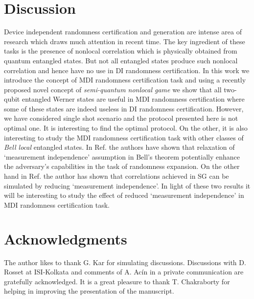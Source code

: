 \documentclass[doublecol,linenumbers]{epl2} %
\begin{document}
\section{Discussion}\label{sec5}

Device independent randomness certification and generation are intense area of research which draws much attention in recent time. The key ingredient of these tasks is the  presence of nonlocal correlation which is physically obtained from quantum entangled states. But not all entangled states produce such nonlocal correlation and hence have no use in DI randomness certification. In this work we introduce the concept of MDI randomness certification task and using a recently proposed novel concept of \emph{semi-quantum nonlocal game} we show that all two-qubit entangled Werner states are useful in MDI randomness certification where some of these states are indeed useless in DI randomness certification. However, we have considered single shot scenario and the protocol presented here is not optimal one. It is interesting to find the optimal protocol. On the other, it is also interesting to study the MDI randomness certification task with other classes of \emph{Bell local} entangled states. In Ref.\cite{Koh} the authors have shown that relaxation of `measurement independence' assumption in Bell's theorem potentially enhance the adversary's capabilities in the task of randomness expansion. On the other hand in Ref.\cite{Banik} the author has shown that correlations achieved in SG can be simulated by reducing `measurement independence'. In light of these two results it will be interesting to study the effect of reduced `measurement independence' in MDI randomness certification task.

\section{Acknowledgments}
The author likes to thank G. Kar for simulating discussions. Discussions with D. Rosset at ISI-Kolkata and comments of A. Ac\'{i}n in a private communication are gratefully acknowledged. It is a great pleasure to thank T. Chakraborty for helping in improving the presentation of the manuscript.
\end{document}
